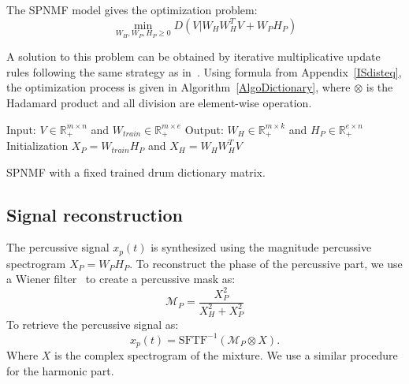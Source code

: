 \documentclass{article}
\begin{document}
The SPNMF model gives the optimization problem: 
\begin{equation}\label{InitCost}
\min_{W_H,W_P,H_P \geq 0} D(V|W_{H}W_{H}^{T}V + W_{P} H_{P})  
\end{equation}

A solution to this problem can be obtained by iterative multiplicative update rules following the same strategy as in~\cite{yuanOja2005,Lee01algorithmsfor}. %
Using formula from Appendix~\ref{ISdisteq}, the optimization process is given in Algorithm~\ref{AlgoDictionary}, where $\otimes$ is the Hadamard product and all division are element-wise operation.
 
\begin{algorithm}[h]
 Input: $V \in \mathbb{R}_{+}^{m \times n} $ and $ W_{train} \in \mathbb{R}_+^{m \times e}$
 Output: $W_H \in \mathbb{R}_{+}^{m \times k}$ and $H_P \in \mathbb{R}_{+}^{e \times n}$
 Initialization\;
 $ X_P = W_{train}H_P $ and
 $ X_H = W_HW_H^TV $ 
  
\vspace{0.2cm}
 \caption{SPNMF with a fixed trained drum dictionary matrix.}\label{AlgoDictionary}
\end{algorithm}




 \vspace{-2cm}

\subsection{Signal reconstruction}

The percussive signal $x_p(t)$ is synthesized using the magnitude percussive spectrogram $X_P = W_PH_P$. To reconstruct the phase of the percussive part, we use a Wiener filter~\cite{liutkus2015generalized} to create a percussive mask as:
\begin{equation}
\mathcal{M}_P = \frac{X_P^2}{X_H^2 + X_P^2}
\end{equation} 
To retrieve the percussive signal as: 
\begin{equation}
x_p(t) = \mbox{SFTF}^{-1}(\mathcal{M}_P \otimes X).
\end{equation}
Where $X$ is the complex spectrogram of the mixture.
We use a similar procedure for the harmonic part.
\end{document}
